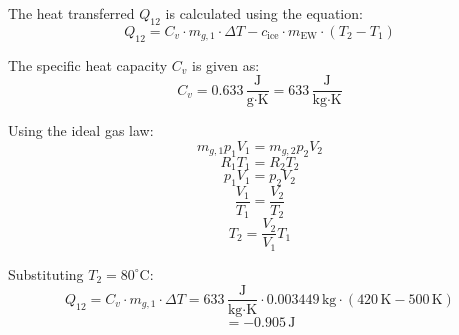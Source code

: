 The heat transferred \( Q_{12} \) is calculated using the equation:  
\[
Q_{12} = C_v \cdot m_{g,1} \cdot \Delta T - c_{\text{ice}} \cdot m_{\text{EW}} \cdot (T_2 - T_1)
\]  

The specific heat capacity \( C_v \) is given as:  
\[
C_v = 0.633 \, \frac{\text{J}}{\text{g·K}} = 633 \, \frac{\text{J}}{\text{kg·K}}
\]  

Using the ideal gas law:  
\[
m_{g,1} p_1 V_1 = m_{g,2} p_2 V_2
\]  
\[
R_1 T_1 = R_2 T_2
\]  
\[
p_1 V_1 = p_2 V_2
\]  
\[
\frac{V_1}{T_1} = \frac{V_2}{T_2}
\]  
\[
T_2 = \frac{V_2}{V_1} T_1
\]  

Substituting \( T_2 = 80^\circ\text{C} \):  
\[
Q_{12} = C_v \cdot m_{g,1} \cdot \Delta T = 633 \, \frac{\text{J}}{\text{kg·K}} \cdot 0.003449 \, \text{kg} \cdot (420 \, \text{K} - 500 \, \text{K})
\]  
\[
= -0.905 \, \text{J}
\]